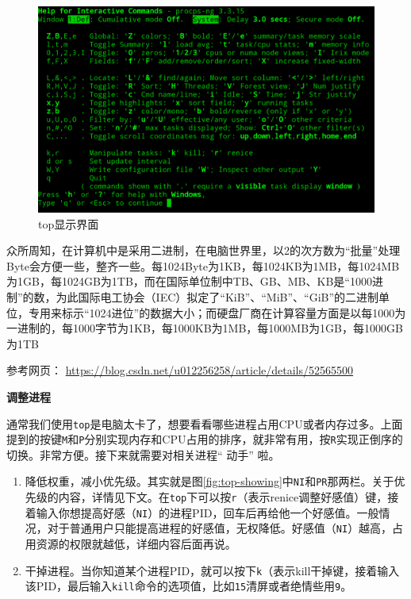 \documentclass[doctor,openright,twoside]{sjtuthesis}
\providecommand{\tightlist}{%
    \setlength{\itemsep}{0pt}\setlength{\parskip}{0pt}}
\newcommand{\passthrough}[1]{#1}
\theoremstyle{plain}
\theoremstyle{definition}
\theoremstyle{remark}
\theoremstyle{ocrenumbox}
\theoremstyle{plain}
\let\BeginKnitrBlock\begin \let\EndKnitrBlock\end
\begin{document}
\begin{figure}

{\centering \includegraphics[width=1\linewidth]{images/top-help} 

}

\caption[top显示界面]{top显示界面}\label{fig:top-help}
\end{figure}

\BeginKnitrBlock{rmdtip}
众所周知，在计算机中是采用二进制，在电脑世界里，以2的次方数为``批量''处理Byte会方便一些，整齐一些。每1024Byte为1KB，每1024KB为1MB，每1024MB为1GB，每1024GB为1TB，而在国际单位制中TB、GB、MB、KB是``1000进制''的数，为此国际电工协会（IEC）拟定了``KiB''、``MiB''、``GiB''的二进制单位，专用来标示``1024进位''的数据大小；而硬盘厂商在计算容量方面是以每1000为一进制的，每1000字节为1KB，每1000KB为1MB，每1000MB为1GB，每1000GB为1TB

参考网页： \url{https://blog.csdn.net/u012256258/article/details/52565500}
\EndKnitrBlock{rmdtip}

\textbf{调整进程}

通常我们使用\passthrough{\lstinline!top!}是电脑太卡了，想要看看哪些进程占用CPU或者内存过多。上面提到的按键\passthrough{\lstinline!M!}和\passthrough{\lstinline!P!}分别实现内存和CPU占用的排序，就非常有用，按\passthrough{\lstinline!R!}实现正倒序的切换。非常方便。接下来就需要对相关进程`` 动手'' 啦。

\begin{enumerate}
\def\labelenumi{\arabic{enumi}.}
\tightlist
\item
  降低权重，减小优先级。其实就是图\ref{fig:top-showing}中\passthrough{\lstinline!NI!}和\passthrough{\lstinline!PR!}那两栏。关于优先级的内容，详情见下文。在\passthrough{\lstinline!top!}下可以按\passthrough{\lstinline!r!}（表示renice调整好感值）键，接着输入你想提高好感（\passthrough{\lstinline!NI!}）的进程PID，回车后再给他一个好感值。一般情况，对于普通用户只能提高进程的好感值，无权降低。好感值（\passthrough{\lstinline!NI!}）越高，占用资源的权限就越低，详细内容后面再说。
\item
  干掉进程。当你知道某个进程PID，就可以按下\passthrough{\lstinline!k!}（表示kill干掉键，接着输入该PID，最后输入\passthrough{\lstinline!kill!}命令的选项值，比如\passthrough{\lstinline!15!}清屏或者绝情些用\passthrough{\lstinline!9!}。
\end{enumerate}
\end{document}
